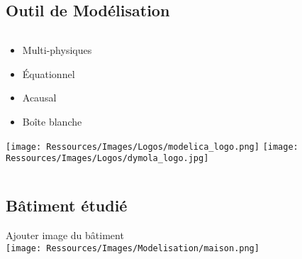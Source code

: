 \documentclass[xcolor=x11names, compress, 11pt]{beamer}
\begin{document}
\subsection{Outil de Modélisation}
\begin{frame}[c]
    \vfill
    \begin{columns}
        \begin{column}{0.45\textwidth}
            \begin{center}
                \begin{itemize}
                    \item Multi-physiques
                    \item Équationnel
                    \item Acausal
                    \item Boîte blanche
                \end{itemize}
            \end{center}
            \texttt{[image: Ressources/Images/Logos/modelica\_logo.png]}
            \texttt{[image: Ressources/Images/Logos/dymola\_logo.jpg]}
        \end{column}%
    \end{columns}%
    \vfill
\end{frame}




\subsection{Bâtiment étudié}
\begin{frame}[c]
    \vfill
    \centering
    Ajouter image du bâtiment \\
    \texttt{[image: Ressources/Images/Modelisation/maison.png]}
    \vfill
\end{frame}
\end{document}
